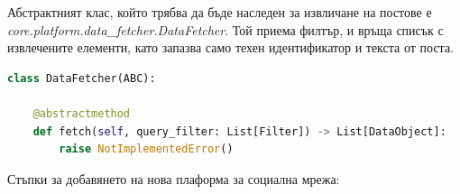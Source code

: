 \documentclass{article}
\newcounter{subsubsubsection}[subsubsection]
\begin{document}

Абстрактният клас, който трябва да бъде наследен за извличане на постове е
\textit{core.platform.data\_fetcher.DataFetcher}. Той приема филтър, и връща списък с извлечените елементи, като
запазва само техен идентификатор и текста от поста.

\begin{lstlisting}[language=Python, caption=Абстрактен клас дефиниращ интерфейс за извличане на постове.]
class DataFetcher(ABC):

    @abstractmethod
    def fetch(self, query_filter: List[Filter]) -> List[DataObject]:
        raise NotImplementedError()
\end{lstlisting}


Стъпки за добавянето на нова плаформа за социална мрежа:
\end{document}
